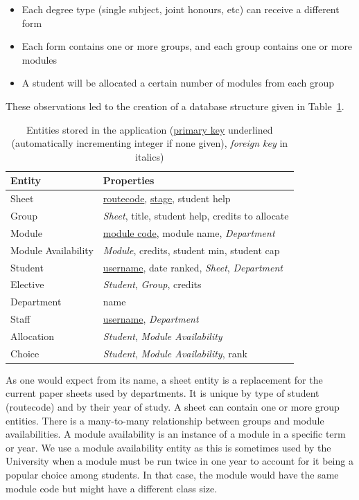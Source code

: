\begin{itemize}
  \item Each degree type (single subject, joint honours, etc) can receive a different form
  \item Each form contains one or more groups, and each group contains one or more modules
  \item A student will be allocated a certain number of modules from each group
\end{itemize}

These observations led to the creation of a database structure given in
Table~\ref{development_database_schema}.

\begin{table}
  \begin{center}
    \begin{tabular}{ | l | l | }
      \hline
      \textbf{Entity} & \textbf{Properties} \\
      \hline
      Sheet & \underline{\gls{routecode}}, \underline{\gls{stage}}, student help \\
      Group & \emph{Sheet}, title, student help, credits to allocate \\
      Module & \underline{module code}, module name, \emph{Department} \\
      Module Availability & \emph{Module}, credits, student min, student cap \\
      Student & \underline{username}, date ranked, \emph{Sheet}, \emph{Department} \\
      Elective & \emph{Student}, \emph{Group}, credits \\
      Department & name \\
      Staff & \underline{username}, \emph{Department} \\
      Allocation & \emph{Student}, \emph{Module Availability} \\
      Choice & \emph{Student}, \emph{Module Availability}, rank \\
      \hline
    \end{tabular}
  \end{center}
  \caption{Entities stored in the application (\underline{primary key}
    underlined (automatically incrementing integer if none given), \emph{foreign
    key} in italics)}
  \label{development_database_schema}
\end{table}

As one would expect from its name, a sheet entity is a replacement for the
current paper sheets used by departments. It is unique by type of student
(\gls{routecode}) and by their year of study. A sheet can contain one or more
group entities. There is a many-to-many relationship between groups and module
availabilities. A module availability is an instance of a module in a specific
term or year. We use a module availability entity as this is sometimes used by
the University when a module must be run twice in one year to account for it
being a popular choice among students. In that case, the module would have the
same module code but might have a different class size.


